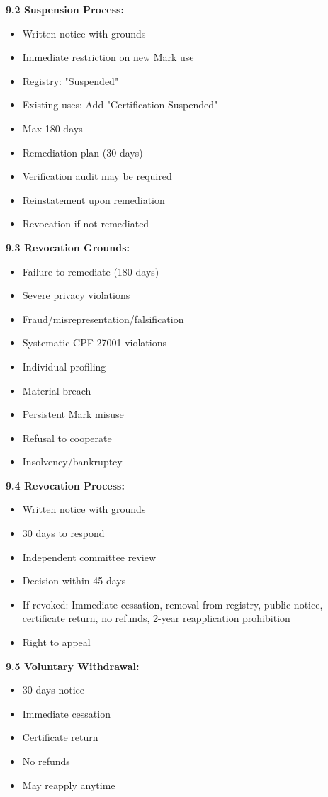\documentclass[11pt,a4paper]{article}
\begin{document}
\textbf{9.2 Suspension Process:}
\begin{itemize}
\item Written notice with grounds
\item Immediate restriction on new Mark use
\item Registry: "Suspended"
\item Existing uses: Add "Certification Suspended"
\item Max 180 days
\item Remediation plan (30 days)
\item Verification audit may be required
\item Reinstatement upon remediation
\item Revocation if not remediated
\end{itemize}

\textbf{9.3 Revocation Grounds:}
\begin{itemize}
\item Failure to remediate (180 days)
\item Severe privacy violations
\item Fraud/misrepresentation/falsification
\item Systematic CPF-27001 violations
\item Individual profiling
\item Material breach
\item Persistent Mark misuse
\item Refusal to cooperate
\item Insolvency/bankruptcy
\end{itemize}

\textbf{9.4 Revocation Process:}
\begin{itemize}
\item Written notice with grounds
\item 30 days to respond
\item Independent committee review
\item Decision within 45 days
\item If revoked: Immediate cessation, removal from registry, public notice, certificate return, no refunds, 2-year reapplication prohibition
\item Right to appeal
\end{itemize}

\textbf{9.5 Voluntary Withdrawal:}
\begin{itemize}
\item 30 days notice
\item Immediate cessation
\item Certificate return
\item No refunds
\item May reapply anytime
\end{itemize}
\end{document}
